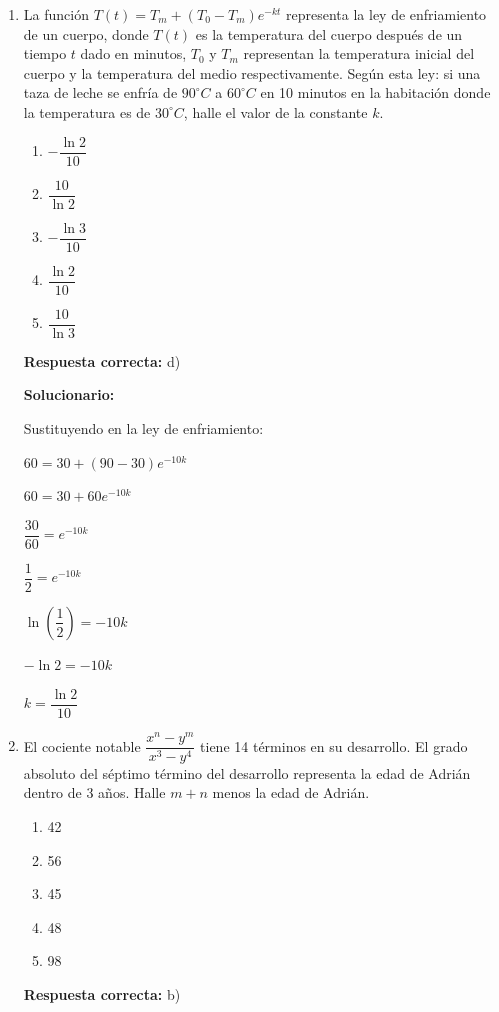 \begin{enumerate}[resume]
	
	\vspace{6mm}
	
	\item La función $T(t)=T_m+(T_0-T_m)e^{-kt}$ representa la ley de enfriamiento de un cuerpo, donde $T(t)$ es la temperatura del cuerpo después de un tiempo $t$ dado en minutos, $T_0$ y $T_m$ representan la temperatura inicial del cuerpo y la temperatura del medio respectivamente. Según esta ley: si una taza de leche se enfría de $90^\circ C$ a $60^\circ C$ en 10 minutos en la habitación donde la temperatura es de $30^\circ C$, halle el valor de la constante $k$.
	\begin{enumerate}[label=\alph*)]
		\item $-\dfrac{\ln 2}{10}$
		\item $\dfrac{10}{\ln 2}$
		\item $-\dfrac{\ln 3}{10}$
		\item $\dfrac{\ln 2}{10}$
		\item $\dfrac{10}{\ln 3}$
	\end{enumerate}
	\textbf{Respuesta correcta:} d)
	
	\vspace{2mm}
	\textbf{Solucionario:}
	
	Sustituyendo en la ley de enfriamiento:
	
	$60=30+(90-30)e^{-10k}$
	
	$60=30+60e^{-10k}$
	
	$\dfrac{30}{60}=e^{-10k}$
	
	$\dfrac{1}{2}=e^{-10k}$
	
	
	$\ln\left(\dfrac{1}{2}\right)=-10k$
	
	$-\ln 2=-10k$
	
	$k=\dfrac{\ln 2}{10}$
	
	
	\vspace{6mm}
	
	\item El cociente notable $\dfrac{x^n-y^m}{x^3-y^4}$ tiene 14 términos en su desarrollo. El grado absoluto del séptimo término del desarrollo representa la edad de Adrián dentro de 3 años. Halle $m+n$ menos la edad de Adrián.
	\begin{enumerate}[label=\alph*)]
		\item 42
		\item 56
		\item 45
		\item 48
		\item 98
	\end{enumerate}
	\textbf{Respuesta correcta:} b)
	

\end{enumerate}
